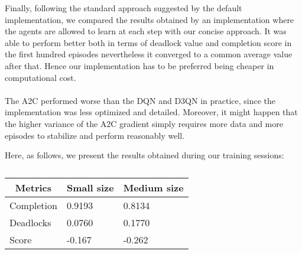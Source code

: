 Finally, following the standard approach suggested by the default implementation, we compared the results obtained by an implementation where the agents are allowed to learn at each step with our concise approach. It was able to perform better both in terms of deadlock value and completion score in the first hundred episodes nevertheless it converged to a common average value after that. Hence our implementation has to be preferred being cheaper in computational cost.\\
\\
The A2C performed worse than the DQN and D3QN in practice, since the implementation was less optimized and detailed. Moreover, it might happen that the higher variance of the A2C gradient simply requires more data and more episodes to stabilize and perform reasonably well.

Here, as follows, we present the results obtained during our training sessions:

\begin{table}[htb]
	\centering
	\bgroup
	\def\arraystretch{1.5}%
	\begin{tabular}{|l|l|l|}
		\hline
		\multicolumn{1}{|c|}{Metrics}                         & \multicolumn{1}{c|}{Small size} & \multicolumn{1}{c|}{Medium size}                          \\ \hline
		Completion                        & 0.9193    & 0.8134    \\ \hline
		Deadlocks                         & 0.0760    & 0.1770    \\ \hline
		Score                             & -0.167    & -0.262     \\ \hline
	\end{tabular}
	\egroup
	\caption{}
	\label{tab:evaluation1}
\end{table}
